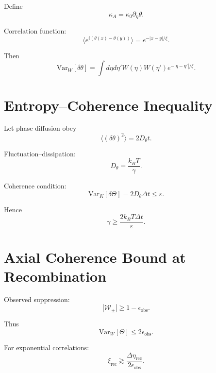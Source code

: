 \documentclass[12pt]{article}
\begin{document}
Define
\begin{equation}
\kappa_A
=
\kappa_0 \partial_\eta \theta.
\end{equation}

Correlation function:
\begin{equation}
\langle
e^{i(\theta(x)-\theta(y))}
\rangle
=
e^{-|x-y|/\xi}.
\end{equation}

Then
\begin{equation}
\mathrm{Var}_W[\delta\theta]
=
\int d\eta d\eta'
W(\eta)W(\eta')
e^{-|\eta-\eta'|/\xi}.
\end{equation}

\section{Entropy--Coherence Inequality}

Let phase diffusion obey
\begin{equation}
\langle (\delta\theta)^2 \rangle
=
2D_\theta t.
\end{equation}

Fluctuation--dissipation:
\begin{equation}
D_\theta
=
\frac{k_B T}{\gamma}.
\end{equation}

Coherence condition:
\begin{equation}
\mathrm{Var}_K[\delta\Theta]
=
2D_\theta \Delta t
\le \varepsilon.
\end{equation}

Hence
\begin{equation}
\gamma
\ge
\frac{2k_B T \Delta t}{\varepsilon}.
\end{equation}

\section{Axial Coherence Bound at Recombination}

Observed suppression:
\begin{equation}
|\mathcal{W}_\pm|
\ge
1-\epsilon_{\mathrm{obs}}.
\end{equation}

Thus
\begin{equation}
\mathrm{Var}_W[\Theta]
\le
2\epsilon_{\mathrm{obs}}.
\end{equation}

For exponential correlations:
\begin{equation}
\xi_{\mathrm{rec}}
\gtrsim
\frac{\Delta\eta_{\mathrm{rec}}}{2\epsilon_{\mathrm{obs}}}.
\end{equation}
\end{document}
